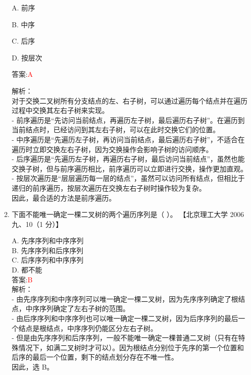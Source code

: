 \documentclass[lang=cn,newtx,10pt,scheme=chinese]{../../../elegantbook}
\begin{document}
\begin{enumerate}
        A. 前序  

        B. 中序  
        
        C. 后序  
        
        D. 按层次  
        
        答案:\textcolor{red}{A}  
        
        解析：\\  
        对于交换二叉树所有分支结点的左、右子树，可以通过遍历每个结点并在遍历过程中交换其左右子树来实现。\\  
        - 前序遍历是“先访问当前结点，再遍历左子树，最后遍历右子树”。在遍历到当前结点时，已经访问到其左右子树，可以在此时交换它们的位置。\\  
        - 中序遍历是“先遍历左子树，再访问当前结点，最后遍历右子树”，不适合在遍历时立即交换左右子树，因为交换操作会影响子树的访问顺序。\\  
        - 后序遍历是“先遍历左子树，再遍历右子树，最后访问当前结点”，虽然也能交换子树，但与前序遍历相比，前序遍历可以立即进行交换，操作更加直观。\\  
        - 按层次遍历是“层层遍历每一层的结点”，虽然可以访问所有结点，但相比于递归的前序遍历，按层次遍历在交换左右子树时操作较为复杂。\\  
        因此，最合适的方法是前序遍历。
        

 

    \item 下面不能唯一确定一棵二叉树的两个遍历序列是（ ）。  
    【北京理工大学 2006 九、10（1 分）】  

    A. 先序序列和中序序列\\

    B. 先序序列和后序序列\\
    
    C. 后序序列和中序序列\\
    
    D. 都不能\\
    
    答案:\textcolor{red}{B}\\
    
    解析：\\
    - 由先序序列和中序序列可以唯一确定一棵二叉树，因为先序序列确定了根结点，中序序列确定了左右子树的范围。\\
    - 由后序序列和中序序列也可以唯一确定一棵二叉树，因为后序序列的最后一个结点是根结点，中序序列仍能区分左右子树。\\
    - 但是由先序序列和后序序列，一般不能唯一确定一棵普通二叉树（只有在特殊情况下，如满二叉树时才可以）。因为根结点分别位于先序的第一个位置和后序的最后一个位置，剩下的结点划分存在不唯一性。\\
    因此，选 B。\\
    


\end{enumerate}
\end{document}
